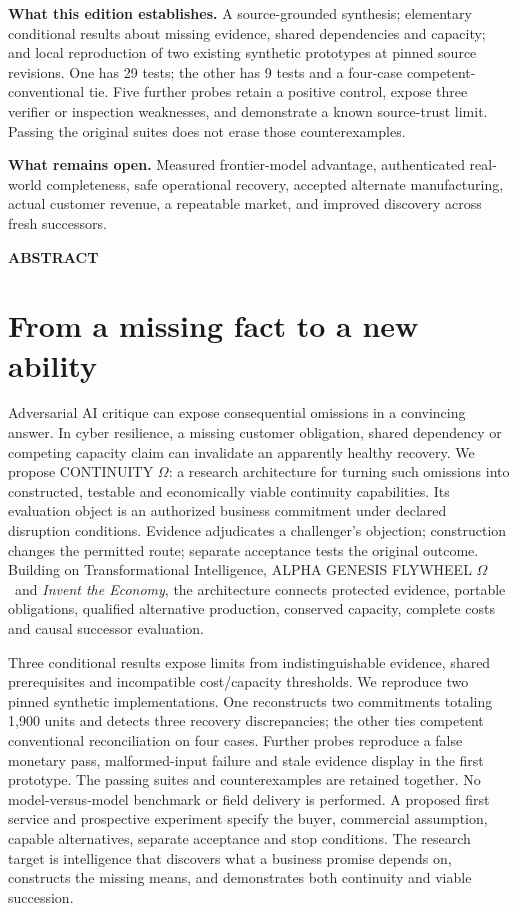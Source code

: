 \documentclass[11pt,a4paper]{article}
\newcommand{\kicker}[1]{{\sffamily\small\bfseries\color{gold}\MakeUppercase{#1}}}
\newcommand{\om}{CONTINUITY $\Omega$}
\newcommand{\ti}{Transformational Intelligence}
\newcommand{\genesis}{ALPHA GENESIS FLYWHEEL $\Omega$}
\newcommand{\chapterpage}{\clearpage}
\begin{document}
\begin{scopebox}
\textbf{What this edition establishes.} A source-grounded synthesis; elementary conditional results about missing evidence, shared dependencies and capacity; and local reproduction of two existing synthetic prototypes at pinned source revisions. One has 29 tests; the other has 9 tests and a four-case competent-conventional tie. Five further probes retain a positive control, expose three verifier or inspection weaknesses, and demonstrate a known source-trust limit. Passing the original suites does not erase those counterexamples.\par
\textbf{What remains open.} Measured frontier-model advantage, authenticated real-world completeness, safe operational recovery, accepted alternate manufacturing, actual customer revenue, a repeatable market, and improved discovery across fresh successors.
\end{scopebox}

\chapterpage
\kicker{Abstract}
\section*{From a missing fact to a new ability}
Adversarial AI critique can expose consequential omissions in a convincing answer. In cyber resilience, a missing customer obligation, shared dependency or competing capacity claim can invalidate an apparently healthy recovery. We propose \om: a research architecture for turning such omissions into constructed, testable and economically viable continuity capabilities. Its evaluation object is an authorized business commitment under declared disruption conditions. Evidence adjudicates a challenger's objection; construction changes the permitted route; separate acceptance tests the original outcome. Building on \ti, \genesis\ and \emph{Invent the Economy}, the architecture connects protected evidence, portable obligations, qualified alternative production, conserved capacity, complete costs and causal successor evaluation.

Three conditional results expose limits from indistinguishable evidence, shared prerequisites and incompatible cost/capacity thresholds. We reproduce two pinned synthetic implementations. One reconstructs two commitments totaling 1,900 units and detects three recovery discrepancies; the other ties competent conventional reconciliation on four cases. Further probes reproduce a false monetary pass, malformed-input failure and stale evidence display in the first prototype. The passing suites and counterexamples are retained together. No model-versus-model benchmark or field delivery is performed. A proposed first service and prospective experiment specify the buyer, commercial assumption, capable alternatives, separate acceptance and stop conditions. The research target is intelligence that discovers what a business promise depends on, constructs the missing means, and demonstrates both continuity and viable succession.
\end{document}
